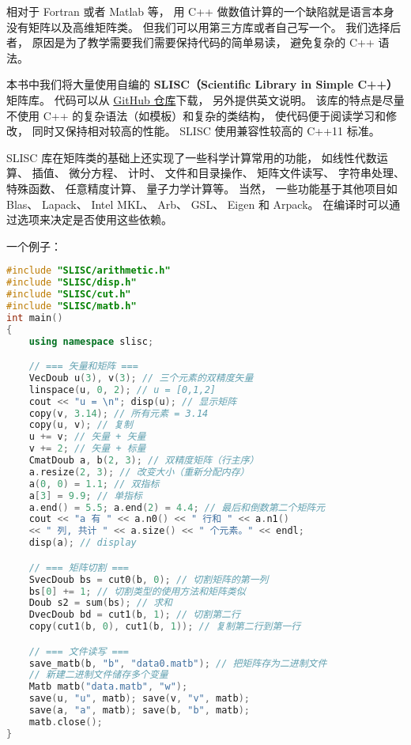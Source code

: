 

相对于 Fortran 或者 Matlab 等， 用 C++ 做数值计算的一个缺陷就是语言本身没有矩阵以及高维矩阵类。 但我们可以用第三方库或者自己写一个。 我们选择后者， 原因是为了教学需要我们需要保持代码的简单易读， 避免复杂的 C++ 语法。

本书中我们将大量使用自编的 \textbf{SLISC（Scientific Library in Simple C++）} 矩阵库。 代码可以从 \href{https://github.com/MacroUniverse/SLISC}{GitHub 仓库}下载， 另外提供英文说明。 该库的特点是尽量不使用 C++ 的复杂语法（如模板）和复杂的类结构， 使代码便于阅读学习和修改， 同时又保持相对较高的性能。 SLISC 使用兼容性较高的 C++11 标准。

SLISC 库在矩阵类的基础上还实现了一些科学计算常用的功能， 如线性代数运算、 插值、 微分方程、 计时、 文件和目录操作、 矩阵文件读写、 字符串处理、 特殊函数、 任意精度计算、 量子力学计算等。 当然， 一些功能基于其他项目如 Blas、 Lapack、 Intel MKL、 Arb、 GSL、 Eigen 和 Arpack。 在编译时可以通过选项来决定是否使用这些依赖。

一个例子：
\begin{lstlisting}[language=cpp, caption=intro.cpp]
#include "SLISC/arithmetic.h"
#include "SLISC/disp.h"
#include "SLISC/cut.h"
#include "SLISC/matb.h"
int main()
{
	using namespace slisc;

	// === 矢量和矩阵 ===
	VecDoub u(3), v(3); // 三个元素的双精度矢量
	linspace(u, 0, 2); // u = [0,1,2]
	cout << "u = \n"; disp(u); // 显示矩阵
	copy(v, 3.14); // 所有元素 = 3.14
	copy(u, v); // 复制
	u += v; // 矢量 + 矢量
	v += 2; // 矢量 + 标量
	CmatDoub a, b(2, 3); // 双精度矩阵（行主序）
	a.resize(2, 3); // 改变大小（重新分配内存）
	a(0, 0) = 1.1; // 双指标
	a[3] = 9.9; // 单指标
	a.end() = 5.5; a.end(2) = 4.4; // 最后和倒数第二个矩阵元
	cout << "a 有 " << a.n0() << " 行和 " << a.n1()
	<< " 列, 共计 " << a.size() << " 个元素。" << endl;
	disp(a); // display

	// === 矩阵切割 ===
	SvecDoub bs = cut0(b, 0); // 切割矩阵的第一列
	bs[0] += 1; // 切割类型的使用方法和矩阵类似
	Doub s2 = sum(bs); // 求和
	DvecDoub bd = cut1(b, 1); // 切割第二行
	copy(cut1(b, 0), cut1(b, 1)); // 复制第二行到第一行

	// === 文件读写 ===
	save_matb(b, "b", "data0.matb"); // 把矩阵存为二进制文件
	// 新建二进制文件储存多个变量
	Matb matb("data.matb", "w");
	save(u, "u", matb); save(v, "v", matb);
	save(a, "a", matb); save(b, "b", matb);
	matb.close();
}
\end{lstlisting}

